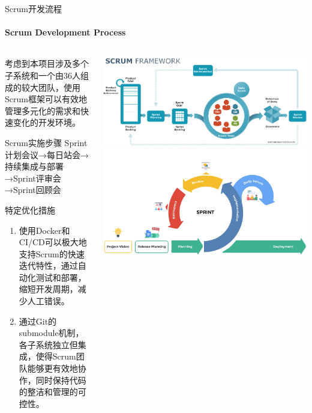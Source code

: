 \documentclass{beamer}
\begin{document}
\begin{frame}[fragile]{Scrum开发流程}
\framesubtitle{Scrum Development Process}
\begin{columns}
\begin{column}{0.5\textwidth}
\footnotesize 考虑到本项目涉及多个子系统和一个由36人组成的较大团队，使用Scrum框架可以有效地管理多元化的需求和快速变化的开发环境。
\begin{block}{Scrum实施步骤}
\footnotesize Sprint计划会议→每日站会→持续集成与部署→Sprint评审会→Sprint回顾会
\end{block}
\begin{block}{特定优化措施}
\begin{enumerate}
\item \footnotesize 使用Docker和CI/CD可以极大地支持Scrum的快速迭代特性，通过自动化测试和部署，缩短开发周期，减少人工错误。
\item \footnotesize 通过Git的submodule机制，各子系统独立但集成，使得Scrum团队能够更有效地协作，同时保持代码的整洁和管理的可控性。
\end{enumerate}
\end{block}
\end{column}
\begin{column}{0.5\textwidth}
\includegraphics[width=\textwidth]
{figures/scrum_framework}
\includegraphics[width=\textwidth]
{figures/scrum_sprint}
\end{column}
\end{columns}
\end{frame}
\end{document}
